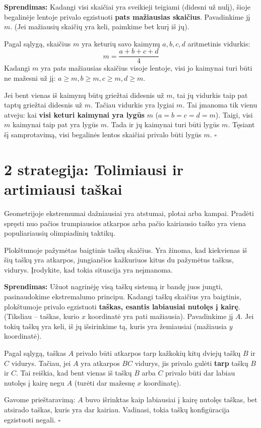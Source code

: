 \documentclass[11pt,a4paper]{scrartcl}
\newenvironment{solution}
    {\begin{list}{}{\setlength{\leftmargin}{10pt}\setlength{\rightmargin}{10pt}}\item[]}
    {\end{list}}
\begin{document}
\begin{solution}
\textbf{Sprendimas:}
Kadangi visi skaičiai yra sveikieji teigiami (didesni už nulį), šioje begalinėje lentoje privalo egzistuoti \textbf{pats mažiausias skaičius}. Pavadinkime jį $m$. (Jei mažiausių skaičių yra keli, paimkime bet kurį iš jų).

Pagal sąlygą, skaičius $m$ yra keturių savo kaimynų $a, b, c, d$ aritmetinis vidurkis:
\[ m = \frac{a + b + c + d}{4} \]
Kadangi $m$ yra pats mažiausias skaičius visoje lentoje, visi jo kaimynai turi būti ne mažesni už jį: $a \ge m, b \ge m, c \ge m, d \ge m$.

Jei bent vienas iš kaimynų būtų griežtai didesnis už $m$, tai jų vidurkis taip pat taptų griežtai didesnis už $m$. Tačiau vidurkis yra lygiai $m$. Tai įmanoma tik vienu atveju: kai \textbf{visi keturi kaimynai yra lygūs} $m$ ($a=b=c=d=m$).
Taigi, visi $m$ kaimynai taip pat yra lygūs $m$. Tada ir jų kaimynai turi būti lygūs $m$. Tęsiant šį samprotavimą, visi begalinės lentos skaičiai privalo būti lygūs $m$. \hfill $\square$
\end{solution}

\section{2 strategija: Tolimiausi ir artimiausi taškai}

Geometrijoje ekstremumai dažniausiai yra atstumai, plotai arba kampai. Pradėti spręsti nuo pačios trumpiausios atkarpos arba pačio kairiausio taško yra viena populiariausių olimpiadinių taktikų.

\begin{example}
Plokštumoje pažymėtas baigtinis taškų skaičius. Yra žinoma, kad kiekvienas iš šių taškų yra atkarpos, jungiančios kažkuriuos kitus du pažymėtus taškus, vidurys. Įrodykite, kad tokia situacija yra neįmanoma.
\end{example}

\begin{solution}
\textbf{Sprendimas:}
Užuot nagrinėję visą taškų sistemą ir bandę juos jungti, pasinaudokime ekstremalumo principu. Kadangi taškų skaičius yra baigtinis, plokštumoje privalo egzistuoti \textbf{taškas, esantis labiausiai nutolęs į kairę}. (Tiksliau – taškas, kurio $x$ koordinatė yra pati mažiausia). Pavadinkime jį $A$. Jei tokių taškų yra keli, iš jų išsirinkime tą, kuris yra žemiausiai (mažiausia $y$ koordinatė).

Pagal sąlygą, taškas $A$ privalo būti atkarpos tarp kažkokių kitų dviejų taškų $B$ ir $C$ vidurys. 
Tačiau, jei $A$ yra atkarpos $BC$ vidurys, jis privalo gulėti \textbf{tarp} taškų $B$ ir $C$. Tai reiškia, kad bent vienas iš taškų $B$ arba $C$ privalo būti dar labiau nutolęs į kairę negu $A$ (turėti dar mažesnę $x$ koordinatę). 

Gavome prieštaravimą: $A$ buvo išrinktas kaip labiausiai į kairę nutolęs taškas, bet atsirado taškas, kuris yra dar kairiau. Vadinasi, tokia taškų konfigūracija egzistuoti negali. \hfill $\square$
\end{solution}
\end{document}
